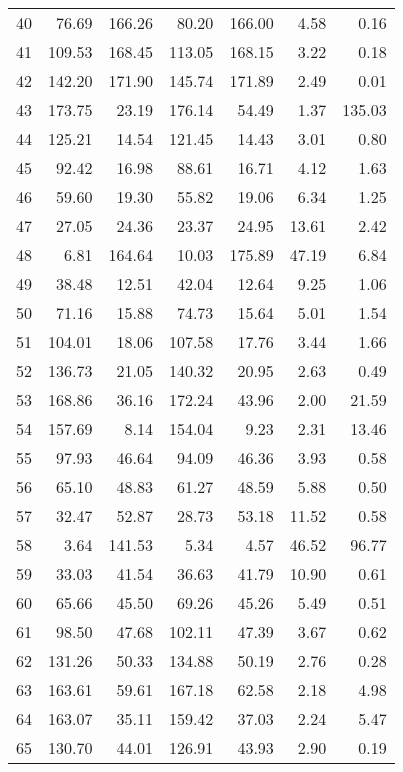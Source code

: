 \begin{tabular}{lrrrrrr}
40 &    76.69 &   166.26 &      80.20 &     166.00 &          4.58 &          0.16 \\
41 &   109.53 &   168.45 &     113.05 &     168.15 &          3.22 &          0.18 \\
42 &   142.20 &   171.90 &     145.74 &     171.89 &          2.49 &          0.01 \\
43 &   173.75 &    23.19 &     176.14 &      54.49 &          1.37 &        135.03 \\
44 &   125.21 &    14.54 &     121.45 &      14.43 &          3.01 &          0.80 \\
45 &    92.42 &    16.98 &      88.61 &      16.71 &          4.12 &          1.63 \\
46 &    59.60 &    19.30 &      55.82 &      19.06 &          6.34 &          1.25 \\
47 &    27.05 &    24.36 &      23.37 &      24.95 &         13.61 &          2.42 \\
48 &     6.81 &   164.64 &      10.03 &     175.89 &         47.19 &          6.84 \\
49 &    38.48 &    12.51 &      42.04 &      12.64 &          9.25 &          1.06 \\
50 &    71.16 &    15.88 &      74.73 &      15.64 &          5.01 &          1.54 \\
51 &   104.01 &    18.06 &     107.58 &      17.76 &          3.44 &          1.66 \\
52 &   136.73 &    21.05 &     140.32 &      20.95 &          2.63 &          0.49 \\
53 &   168.86 &    36.16 &     172.24 &      43.96 &          2.00 &         21.59 \\
54 &   157.69 &     8.14 &     154.04 &       9.23 &          2.31 &         13.46 \\
55 &    97.93 &    46.64 &      94.09 &      46.36 &          3.93 &          0.58 \\
56 &    65.10 &    48.83 &      61.27 &      48.59 &          5.88 &          0.50 \\
57 &    32.47 &    52.87 &      28.73 &      53.18 &         11.52 &          0.58 \\
58 &     3.64 &   141.53 &       5.34 &       4.57 &         46.52 &         96.77 \\
59 &    33.03 &    41.54 &      36.63 &      41.79 &         10.90 &          0.61 \\
60 &    65.66 &    45.50 &      69.26 &      45.26 &          5.49 &          0.51 \\
61 &    98.50 &    47.68 &     102.11 &      47.39 &          3.67 &          0.62 \\
62 &   131.26 &    50.33 &     134.88 &      50.19 &          2.76 &          0.28 \\
63 &   163.61 &    59.61 &     167.18 &      62.58 &          2.18 &          4.98 \\
64 &   163.07 &    35.11 &     159.42 &      37.03 &          2.24 &          5.47 \\
65 &   130.70 &    44.01 &     126.91 &      43.93 &          2.90 &          0.19 \\
\bottomrule
\end{tabular}

